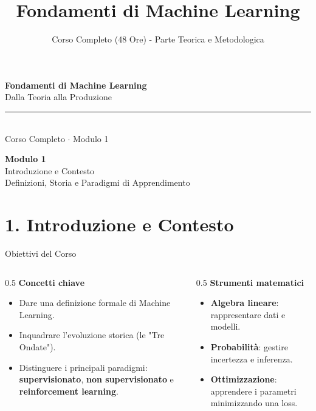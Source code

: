 \documentclass[aspectratio=169, 10pt]{beamer}
\title{Fondamenti di Machine Learning}
\subtitle{Corso Completo (48 Ore) - Parte Teorica e Metodologica}
\author{}
\date{}
\begin{document}
\begin{frame}
    \vspace{1cm}
    \centering
    {\Huge \textbf{Fondamenti di Machine Learning}}\\[0.2cm]
    {\Large Dalla Teoria alla Produzione}\\[1cm]
    {\color{Accent}\rule{5cm}{2pt}}\\[1cm]
    \small Corso Completo $\cdot$ Modulo 1
\end{frame}


\begin{frame}[plain]
    \centering
    \vspace{2cm}
    {\Huge \textbf{Modulo 1}}\\[0.5cm]
    {\Huge \textcolor{Accent}{Introduzione e Contesto}}\\[1cm]
    {\large Definizioni, Storia e Paradigmi di Apprendimento}
\end{frame}

\section{1. Introduzione e Contesto}

\begin{frame}{Obiettivi del Corso}
    \begin{columns}[T]
        \begin{column}{0.5\textwidth}
            \textbf{Concetti chiave}
            \begin{itemize}
                \item Dare una definizione formale di Machine Learning.
                \item Inquadrare l'evoluzione storica (le "Tre Ondate").
                \item Distinguere i principali paradigmi: \textbf{supervisionato}, \textbf{non supervisionato} e \textbf{reinforcement learning}.
            \end{itemize}
        \end{column}
        \begin{column}{0.5\textwidth}
            \textbf{Strumenti matematici}
            \begin{itemize}
                \item \textbf{Algebra lineare}: rappresentare dati e modelli.
                \item \textbf{Probabilità}: gestire incertezza e inferenza.
                \item \textbf{Ottimizzazione}: apprendere i parametri minimizzando una loss.
            \end{itemize}
        \end{column}
    \end{columns}
\end{frame}
\end{document}

